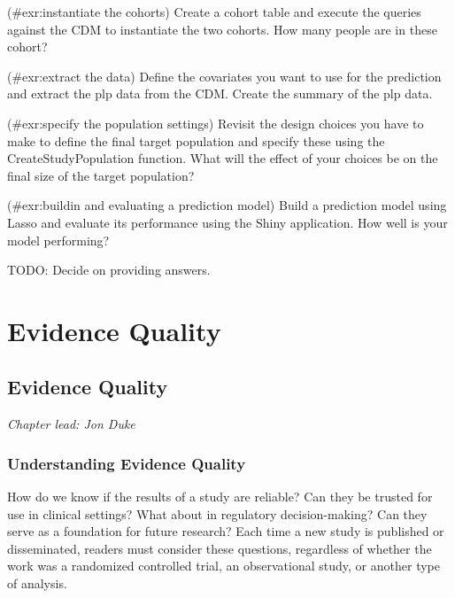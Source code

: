 \documentclass[11pt]{book}
\theoremstyle{definition}
\theoremstyle{definition}
\theoremstyle{definition}
\theoremstyle{remark}
\let\BeginKnitrBlock\begin \let\EndKnitrBlock\end
\begin{document}
\BeginKnitrBlock{exercise}
\protect\hypertarget{exr:instantiateux20theux20cohorts}{}{(\#exr:instantiate the cohorts) }Create a cohort table and execute the queries against the CDM to instantiate the two cohorts. How many people are in these cohort?
\EndKnitrBlock{exercise}

\BeginKnitrBlock{exercise}
\protect\hypertarget{exr:extractux20theux20data}{}{(\#exr:extract the data) }Define the covariates you want to use for the prediction and extract the plp data from the CDM. Create the summary of the plp data.
\EndKnitrBlock{exercise}

\BeginKnitrBlock{exercise}
\protect\hypertarget{exr:specifyux20theux20populationux20settings}{}{(\#exr:specify the population settings) }Revisit the design choices you have to make to define the final target population and specify these using the CreateStudyPopulation function. What will the effect of your choices be on the final size of the target population?
\EndKnitrBlock{exercise}

\BeginKnitrBlock{exercise}
\protect\hypertarget{exr:buildinux20andux20evaluatingux20aux20predictionux20model}{}{(\#exr:buildin and evaluating a prediction model) }Build a prediction model using Lasso and evaluate its performance using the Shiny application. How well is your model performing?
\EndKnitrBlock{exercise}

TODO: Decide on providing answers.

\hypertarget{part-evidence-quality}{%
\part{Evidence Quality}\label{part-evidence-quality}}

\hypertarget{EvidenceQuality}{%
\chapter{Evidence Quality}\label{EvidenceQuality}}

\emph{Chapter lead: Jon Duke}

\hypertarget{understanding-evidence-quality}{%
\section{Understanding Evidence Quality}\label{understanding-evidence-quality}}

How do we know if the results of a study are reliable? Can they be trusted for use in clinical settings? What about in regulatory decision-making? Can they serve as a foundation for future research? Each time a new study is published or disseminated, readers must consider these questions, regardless of whether the work was a randomized controlled trial, an observational study, or another type of analysis.  
\end{document}
